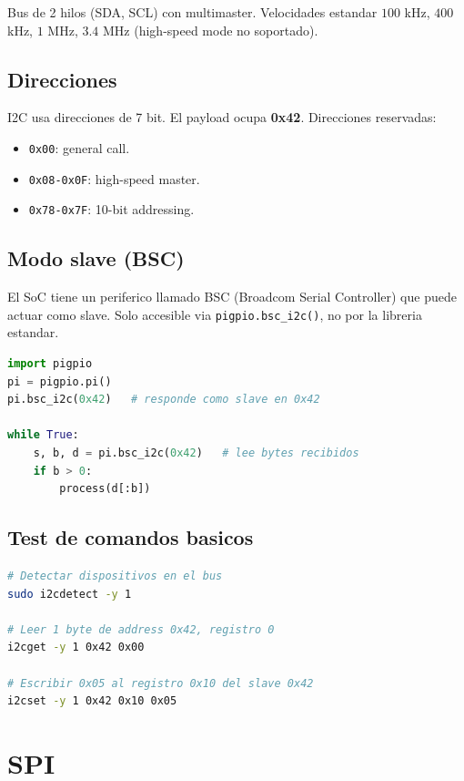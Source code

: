 \documentclass[11pt,a4paper,oneside]{report}
\begin{document}
Bus de 2 hilos (SDA, SCL) con multimaster. Velocidades estandar $100$ kHz,
$400$ kHz, $1$ MHz, $3.4$ MHz (high-speed mode no soportado).

\subsection{Direcciones}

I2C usa direcciones de 7 bit. El payload ocupa \textbf{0x42}. Direcciones
reservadas:

\begin{itemize}[leftmargin=2em]
  \item \texttt{0x00}: general call.
  \item \texttt{0x08-0x0F}: high-speed master.
  \item \texttt{0x78-0x7F}: 10-bit addressing.
\end{itemize}

\subsection{Modo slave (BSC)}

El SoC tiene un periferico llamado BSC (Broadcom Serial Controller) que
puede actuar como slave. Solo accesible via \texttt{pigpio.bsc\_i2c()},
no por la libreria estandar.

\begin{lstlisting}[language=python]
import pigpio
pi = pigpio.pi()
pi.bsc_i2c(0x42)   # responde como slave en 0x42

while True:
    s, b, d = pi.bsc_i2c(0x42)   # lee bytes recibidos
    if b > 0:
        process(d[:b])
\end{lstlisting}

\subsection{Test de comandos basicos}

\begin{lstlisting}[language=bash]
# Detectar dispositivos en el bus
sudo i2cdetect -y 1

# Leer 1 byte de address 0x42, registro 0
i2cget -y 1 0x42 0x00

# Escribir 0x05 al registro 0x10 del slave 0x42
i2cset -y 1 0x42 0x10 0x05
\end{lstlisting}

\section{SPI}
\end{document}
